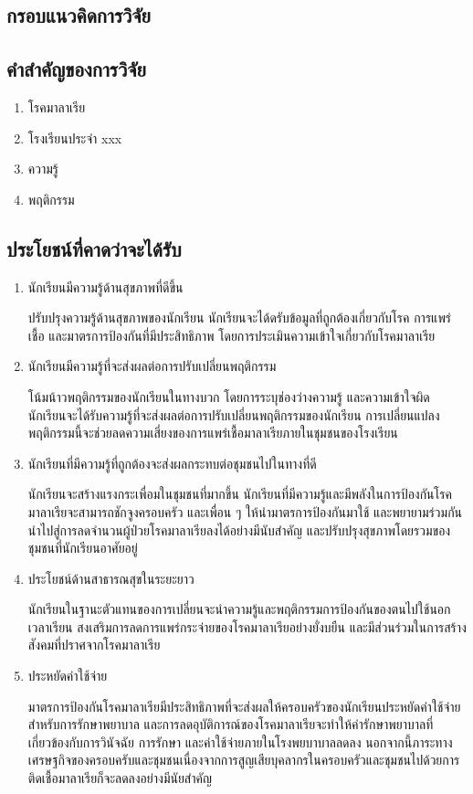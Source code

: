 \subsection{กรอบแนวคิดการวิจัย}

\subsection{คำสำคัญของการวิจัย}
\begin{enumerate}
  \item โรคมาลาเรีย
  \item โรงเรียนประจำ xxx
  \item ความรู้
  \item พฤติกรรม
\end{enumerate}

\subsection{ประโยชน์ที่คาดว่าจะได้รับ}
\begin{enumerate}
  \item นักเรียนมีความรู้ด้านสุขภาพที่ดีขึ้น

        ปรับปรุงความรู้ด้านสุขภาพของนักเรียน นักเรียนจะได้ดรับข้อมูลที่ถูกต้องเกี่ยวกับโรค การแพร่เชื้อ และมาตรการป้องกันที่มีประสิทธิภาพ โดยการประเมินความเข้าใจเกี่ยวกับโรคมาลาเรีย
  \item นักเรียนมีความรู้ที่จะส่งผลต่อการปรับเปลี่ยนพฤติกรรม

        โน้มน้าวพฤติกรรมของนักเรียนในทางบวก โดยการระบุช่องว่างความรู้ และความเข้าใจผิด นักเรียนจะได้รับความรู้ที่จะส่งผลต่อการปรับเปลี่ยนพฤติกรรมของนักเรียน การเปลี่ยนแปลงพฤติกรรมนี้จะช่วยลดความเสี่ยงของการแพร่เชื้อมาลาเรียภายในชุมชนของโรงเรียน
  \item นักเรียนที่มีความรู้ที่ถูกต้องจะส่งผลกระทบต่อชุมชนไปในทางที่ดี

        นักเรียนจะสร้างแรงกระเพื่อมในชุมชนที่มากขึ้น นักเรียนที่มีความรู้และมีพลังในการป้องกันโรคมาลาเรียจะสามารถชักจูงครอบครัว และเพื่อน ๆ ให้นำมาตรการป้องกันมาใช้ และพยายามร่วมกันนำไปสู่การลดจำนวนผู้ป่วยโรคมาลาเรียลงได้อย่างมีนับสำคัญ และปรับปรุงสุขภาพโดยรวมของชุมชนที่นักเรียนอาศัยอยู่
  \item ประโยชน์ด้านสาธารณสุขในระยะยาว

        นักเรียนในฐานะตัวแทนของการเปลี่ยนจะนำความรู้และพฤติกรรมการป้องกันของตนไปใช้นอกเวลาเรียน สงเสริมการลดการแพร่กระจ่ายของโรคมาลาเรียอย่างยั่งบยืน และมีส่วนร่วมในการสร้างสังคมที่ปราศจากโรคมาลาเรีย
  \item 	ประหยัดค่าใช้จ่าย

        มาตรการป้องกันโรคมาลาเรียมีประสิทธิภาพที่จะส่งผลให้ครอบครัวของนักเรียนประหยัดค่าใช้จ่ายสำหรับการรักษาพยาบาล และการลดอุบัติการณ์ของโรคมาลาเรียจะทำให้ค่ารักษาพยาบาลที่เกี่ยวข้องกับการวินัจฉัย การรักษา และค่าใช้จ่ายภายในโรงพยบาบาลลดลง นอกจากนี้ภาระทางเศรษฐกิจของครอบครับและชุมชนเนื่องจากการสูญเสียบุคลากรในครอบครัวและชุมชนไปด้วยการติดเชื้อมาลาเรียก็จะลดลงอย่างมีนัยสำคัญ
\end{enumerate}